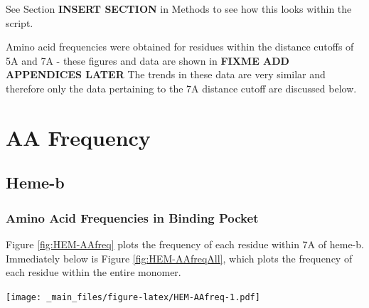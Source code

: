 \documentclass[a4paper, nobind]{templates/ociamthesis}
\let\origfigure\figure
\let\endorigfigure\endfigure
\renewenvironment{figure}[1][2] {
    \expandafter\origfigure\expandafter[H]
} {
    \endorigfigure
}
\begin{document}
See Section \textbf{INSERT SECTION} in Methods to see how this looks within the script.

Amino acid frequencies were obtained for residues within the distance cutoffs of 5A and 7A - these figures and data are shown in \textbf{FIXME ADD APPENDICES LATER} The trends in these data are very similar and therefore only the data pertaining to the 7A distance cutoff are discussed below.

\hypertarget{disc-aaFreq}{%
\section{AA Frequency}\label{disc-aaFreq}}

\hypertarget{heme-b-1}{%
\subsection{Heme-b}\label{heme-b-1}}

\hypertarget{amino-acid-frequencies-in-binding-pocket}{%
\subsubsection{Amino Acid Frequencies in Binding Pocket}\label{amino-acid-frequencies-in-binding-pocket}}

Figure \ref{fig:HEM-AAfreq} plots the frequency of each residue within 7A of heme-b. Immediately below is Figure \ref{fig:HEM-AAfreqAll}, which plots the frequency of each residue within the entire monomer.

\begin{figure}
\centering
\texttt{[image: \_main\_files/figure-latex/HEM-AAfreq-1.pdf]}
\caption{\label{fig:HEM-AAfreq}HEM: AA Frequency within 7A}
\end{figure}
\end{document}

